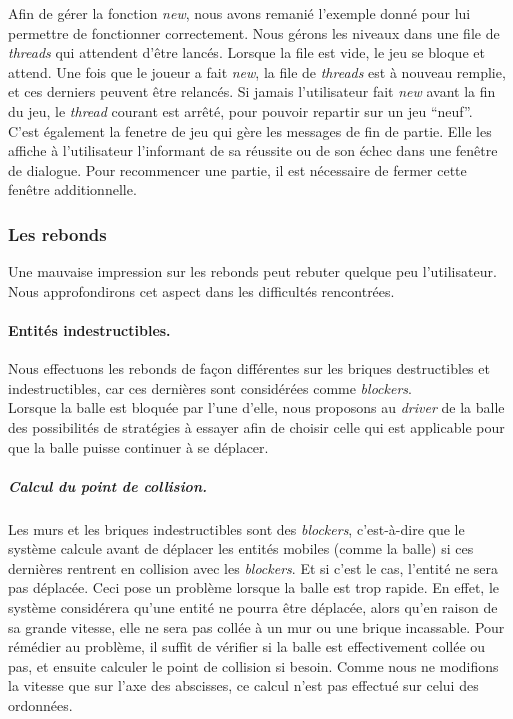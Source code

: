 \documentclass[a4paper,10pt]{article}
\begin{document}
        Afin de gérer la fonction \textit{new}, nous avons remanié l'exemple donné pour lui permettre de fonctionner
        correctement. Nous gérons les niveaux dans une file de \textit{threads} qui attendent d'être lancés. Lorsque la file
        est vide, le jeu se bloque et attend. Une fois que le joueur a fait \textit{new}, la file de \textit{threads} est
        à nouveau remplie, et ces derniers peuvent être relancés. Si jamais l'utilisateur fait \textit{new} avant
        la fin du jeu, le \textit{thread} courant est arrêté, pour pouvoir repartir sur un jeu ``neuf''. \\

        C'est également la fenetre de jeu qui gère les messages de fin de partie. Elle les affiche à l'utilisateur
        l'informant de sa réussite ou de son échec dans une fenêtre de dialogue. Pour recommencer une partie, il
        est nécessaire de fermer cette fenêtre additionnelle.

    \subsubsection{Les rebonds}
        Une mauvaise impression sur les rebonds peut rebuter quelque peu l'utilisateur. Nous approfondirons
        cet aspect dans les difficultés rencontrées.

        \paragraph{Entités indestructibles.}
        Nous effectuons les rebonds de façon
        différentes sur les briques destructibles et indestructibles, car ces dernières sont considérées comme \textit{blockers}. \\
        Lorsque la balle est bloquée par l'une d'elle, nous proposons au \textit{driver} de la balle des possibilités
        de stratégies à essayer afin de choisir celle qui est applicable pour que la balle puisse continuer à se déplacer.

		\subparagraph{Calcul du point de collision.}
            Les murs et les briques indestructibles sont des \textit{blockers}, c'est-à-dire que le système calcule avant de
            déplacer les entités mobiles (comme la balle) si ces dernières rentrent en collision avec les \textit{blockers}.
            Et si c'est le cas, l'entité ne sera pas déplacée. Ceci pose un problème lorsque la balle est trop rapide. En
            effet, le système considérera qu'une entité ne pourra être déplacée, alors qu'en raison de sa grande vitesse,
            elle ne sera pas collée à un mur ou une brique incassable. Pour rémédier au problème, il suffit de vérifier si
            la balle est effectivement collée ou pas, et ensuite calculer le point de collision si besoin.
            Comme nous ne modifions la vitesse que sur l'axe des abscisses, ce calcul n'est pas effectué sur celui des
            ordonnées.
\end{document}

